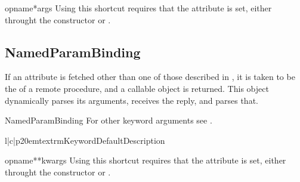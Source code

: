 \begin{methoddesc}{opname}{*args}
Using this shortcut requires that the  attribute is set, either
throught the constructor or .
\end{methoddesc}


\subsection{NamedParamBinding}
If an attribute is fetched other than one of those described
in , it is taken to be the  of a remote procedure, and a callable
object is returned.  This object dynamically parses its arguments, receives the
reply, and parses that.

\begin{classdesc}{NamedParamBinding}{}
For other keyword arguments see .
\begin{tableiii}{l|c|p{20em}}{textrm}{Keyword}{Default}{Description}
\end{tableiii}
\end{classdesc}

\begin{methoddesc}{opname}{**kwargs}
Using this shortcut requires that the  attribute is set, either
throught the constructor or .
\end{methoddesc}



